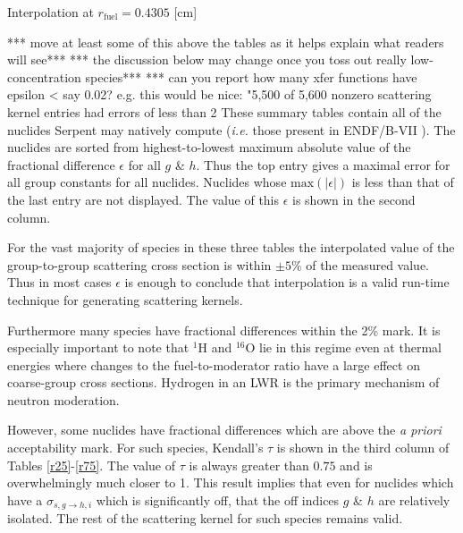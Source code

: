 \documentclass{physor2012}
\newcommand{\superscript}[1]{\ensuremath{^{\textrm{#1}}}}
\newcommand{\nuc}[2]{\superscript{#2}{#1}}
\begin{document}
\begin{table}[htbp]
\begin{center}
\caption{Interpolation at $r_{\mbox{fuel}}=0.4305$ [cm]}
\label{r75}

\end{center}
\end{table}
 *** move at least some of this above the tables as it helps explain what readers will see***
 *** the discussion below may change once you toss out really low-concentration species***
 *** can you report how many xfer functions have epsilon < say 0.02?  e.g. this would be nice:  "5,500 of 5,600 nonzero scattering kernel entries had errors of less than 2%
These summary tables contain all of the nuclides Serpent may natively compute
(\emph{i.e.} those present in ENDF/B-VII \cite{}).  The nuclides are sorted from
highest-to-lowest maximum absolute value of the fractional difference $\epsilon$
for all $g$ \& $h$.  Thus the top entry gives a maximal error for all group
constants for all nuclides.  Nuclides whose $\mbox{max}(|\epsilon|)$ is less than
that of the last entry are not displayed.  The value of this $\epsilon$ is
shown in the second column.

For the vast majority of species in these three tables the interpolated value of
the group-to-group scattering cross section is within $\pm 5\%$ of the measured
value.  Thus in most cases $\epsilon$ is enough to conclude that interpolation
is a valid run-time technique for generating scattering kernels.

Furthermore many species have fractional differences within the 2\% mark.
It is especially important to note that \nuc{H}{1} and \nuc{O}{16} lie in
this regime even at thermal energies where changes to the fuel-to-moderator ratio have a large effect on coarse-group cross sections.  Hydrogen in an LWR is the primary mechanism of neutron
moderation.  

However, some nuclides have fractional differences which are above the
\emph{a priori} acceptability mark.  For such species, Kendall's $\tau$ is
shown in the third column of Tables \ref{r25}-\ref{r75}.  The value of
$\tau$ is always greater than $0.75$ and is overwhelmingly much closer to 1.
This result implies that even for nuclides which have a $\sigma_{s,g\to h,i}$ which
is significantly off, that the off indices $g$ \& $h$ are relatively isolated.
The rest of the scattering kernel for such species remains valid.
\end{document}
